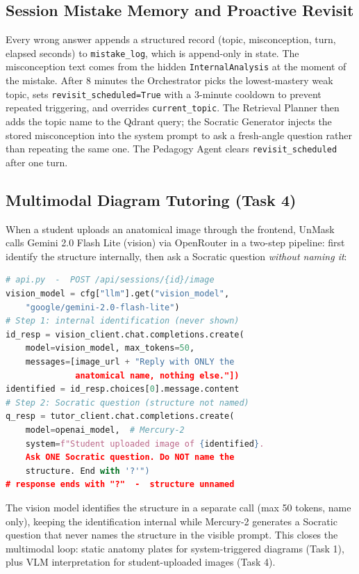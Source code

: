 \documentclass[11pt]{article}
\begin{document}
\subsection{Session Mistake Memory and Proactive Revisit}
\label{sec:memory}

Every wrong answer appends a structured record (topic, misconception, turn,
elapsed seconds) to \texttt{mistake\_log}, which is append-only in state.
The misconception text comes from the hidden \texttt{InternalAnalysis} at the
moment of the mistake.
After 8 minutes the Orchestrator picks the lowest-mastery weak topic, sets
\texttt{revisit\_scheduled=True} with a 3-minute cooldown to prevent repeated
triggering, and overrides \texttt{current\_topic}.
The Retrieval Planner then adds the topic name to the Qdrant query;
the Socratic Generator injects the stored misconception into the system prompt
to ask a fresh-angle question rather than repeating the same one.
The Pedagogy Agent clears \texttt{revisit\_scheduled} after one turn.

\subsection{Multimodal Diagram Tutoring (Task 4)}
\label{sec:vlm}

When a student uploads an anatomical image through the frontend,
UnMask calls Gemini 2.0 Flash Lite (vision) via OpenRouter in a two-step pipeline:
first identify the structure internally, then ask a Socratic question
\emph{without naming it}:

\begin{lstlisting}[language=Python]
# api.py  -  POST /api/sessions/{id}/image
vision_model = cfg["llm"].get("vision_model",
    "google/gemini-2.0-flash-lite")
# Step 1: internal identification (never shown)
id_resp = vision_client.chat.completions.create(
    model=vision_model, max_tokens=50,
    messages=[image_url + "Reply with ONLY the
              anatomical name, nothing else."])
identified = id_resp.choices[0].message.content
# Step 2: Socratic question (structure not named)
q_resp = tutor_client.chat.completions.create(
    model=openai_model,  # Mercury-2
    system=f"Student uploaded image of {identified}.
    Ask ONE Socratic question. Do NOT name the
    structure. End with '?'")
# response ends with "?"  -  structure unnamed
\end{lstlisting}

The vision model identifies the structure in a separate call (max 50 tokens,
name only), keeping the identification internal while Mercury-2 generates
a Socratic question that never names the structure in the visible prompt.
This closes the multimodal loop: static anatomy plates for system-triggered
diagrams (Task 1), plus VLM interpretation for student-uploaded images (Task 4).
\end{document}
